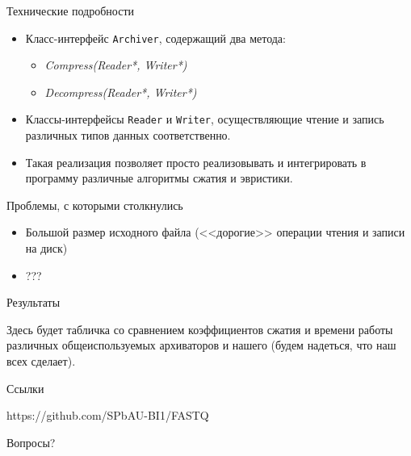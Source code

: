 \documentclass[12pt]{beamer}
\begin{document}
\begin{frame}{Технические подробности}

    \begin{itemize}

        \item Класс-интерфейс \texttt{Archiver}, содержащий два метода:
        
        \begin{itemize}

            \item \textit{Compress(Reader*, Writer*)}

            \item \textit{Decompress(Reader*, Writer*)}

        \end{itemize}

        \item Классы-интерфейсы \texttt{Reader} и \texttt{Writer}, осуществляющие чтение и запись различных типов данных соответственно.  

        \item Такая реализация позволяет просто реализовывать и интегрировать в программу различные алгоритмы сжатия и эвристики.
    
    \end{itemize} 

\end{frame}

\begin{frame}{Проблемы, с которыми столкнулись}

    \begin{itemize}
    
        \item Большой размер исходного файла (<<дорогие>> операции чтения и записи на диск)
        
        \item ???

    \end{itemize}
    
     

\end{frame}

\begin{frame}{Результаты}
    
    Здесь будет табличка со сравнением коэффициентов сжатия и времени работы различных общеиспользуемых архиваторов и нашего (будем надеться, что наш всех сделает).

\end{frame}

\begin{frame}{Ссылки}

    https://github.com/SPbAU-BI1/FASTQ

\end{frame}

\begin{frame}{}

    Вопросы?

\end{frame}
\end{document}
